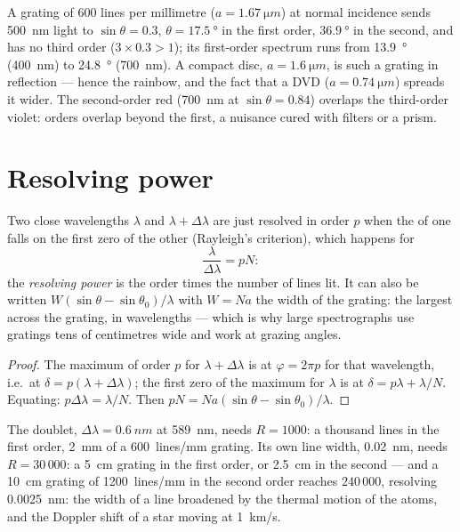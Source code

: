 \begin{example}\label{ex:b2:gratings:examples}
A grating of $600$ lines per millimetre ($a = \qty{1.67}{\micro m}$) at normal
incidence sends \qty{500}{nm} light to $\sin\theta = 0.3$, $\theta = \qty{17.5}{\degree}$ in
the first order, $\qty{36.9}{\degree}$ in the second, and has no third order
($3 \times 0.3 > 1$); its first-order spectrum runs from \qty{13.9}{\degree}
(\qty{400}{nm}) to \qty{24.8}{\degree} (\qty{700}{nm}). A compact disc, $a =
\qty{1.6}{\micro m}$, is such a grating in reflection --- hence the rainbow,
and the fact that a DVD ($a = \qty{0.74}{\micro m}$) spreads it wider. The
second-order red (\qty{700}{nm} at $\sin\theta = 0.84$) overlaps the third-order
violet: orders overlap beyond the first, a nuisance cured with filters
or a prism.
\end{example}

\section{Resolving power}

\begin{proposition}\label{prop:b2:gratings:resolution}
Two close wavelengths $\lambda$ and $\lambda + \Delta\lambda$ are just resolved in order $p$
when the  of one falls on the first zero of the other
(Rayleigh's criterion), which happens for
\[
\frac\lambda{\Delta\lambda} = pN :
\]
the \emph{resolving power} is the order times the number of lines
lit. It can also be written $W(\sin\theta - \sin\theta_0)/\lambda$ with $W = Na$ the
width of the grating: the largest  across the grating,
in wavelengths --- which is why large spectrographs use gratings tens of
centimetres wide and work at grazing angles.
\end{proposition}

\begin{proof}
The maximum of order $p$ for $\lambda + \Delta\lambda$ is at $\varphi = 2\pi p$ for that
wavelength, i.e.\ at $\delta = p(\lambda + \Delta\lambda)$; the first zero of the maximum
for $\lambda$ is at $\delta = p\lambda + \lambda/N$. Equating: $p\Delta\lambda = \lambda/N$. Then $pN =
Na(\sin\theta - \sin\theta_0)/\lambda$.
\end{proof}

\begin{example}\label{ex:b2:gratings:sodium}
The doublet, $\Delta\lambda = \qty{0.6}{nm}$ at \qty{589}{nm}, needs $R = 1000$: a
thousand lines in the first order, \qty{2}{mm} of a \qty{600}{lines/mm}
grating. Its own line width, \qty{0.02}{nm}, needs $R = 30\,000$: a \qty{5}{cm}
grating in the first order, or \qty{2.5}{cm} in the second --- and a
\qty{10}{cm} grating of \qty{1200}{lines/mm} in the second order reaches
$240\,000$, resolving \qty{0.0025}{nm}: the width of a line broadened by
the thermal motion of the atoms, and the Doppler shift of a star moving
at \qty{1}{km/s}.
\end{example}


